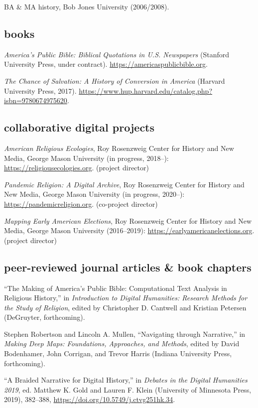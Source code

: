\documentclass[11pt]{article}
\begin{document}
BA \& MA history, Bob Jones University (2006/2008).

\subsection{books}\label{books}

\emph{America's Public Bible: Biblical Quotations in U.S. Newspapers} (Stanford University Press, under contract). \url{https://americaspublicbible.org}.

\emph{The Chance of Salvation: A History of Conversion in America} (Harvard University Press, 2017). \url{https://www.hup.harvard.edu/catalog.php?isbn=9780674975620}.

\subsection{collaborative digital projects}\label{digital projects}

\emph{American Religious Ecologies}, Roy Rosenzweig Center for History and New Media, George Mason University (in progress, 2018--): \url{https://religiousecologies.org}. (project director)

\emph{Pandemic Religion: A Digital Archive}, Roy Rosenzweig Center for History and New Media, George Mason University (in progress, 2020--): \url{https://pandemicreligion.org}. (co-project director)

\emph{Mapping Early American Elections}, Roy Rosenzweig Center for History and New Media, George Mason University (2016--2019): \url{https://earlyamericanelections.org}. (project director)

\subsection{peer-reviewed journal articles \& book chapters}\label{peer-reviewed}

``The Making of America's Public Bible: Computational Text Analysis in Religious History,'' in \emph{Introduction to Digital Humanities: Research Methods for the Study of Religion}, edited by Christopher D. Cantwell and 
Kristian Petersen (DeGruyter, forthcoming).

Stephen Robertson and Lincoln A. Mullen, ``Navigating through Narrative,'' in \emph{Making Deep Maps: Foundations, Approaches, and Methods}, edited by David Bodenhamer, John Corrigan, and Trevor Harris (Indiana 
University Press, forthcoming).

``A Braided Narrative for Digital History,'' in \emph{Debates in the Digital Humanities 2019}, ed. Matthew K. Gold and Lauren F. Klein (University of Minnesota Press, 2019), 382--388, \url{ https://doi.org/10.5749/j.ctvg251hk.34}.
\end{document}
